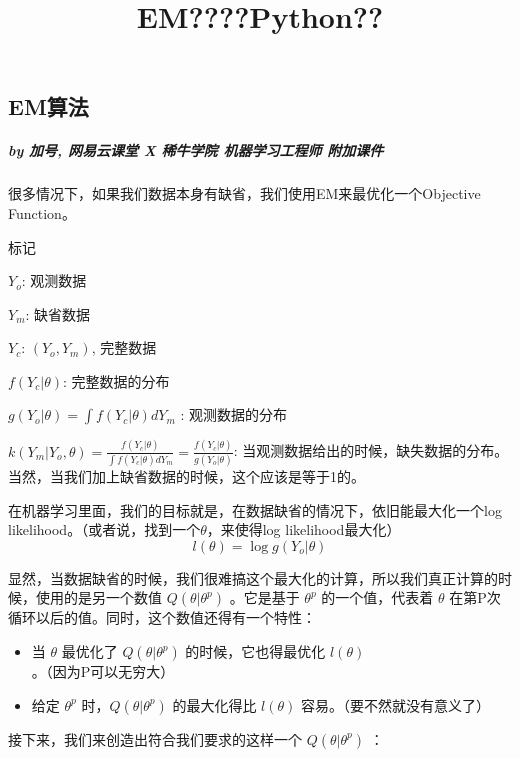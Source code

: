 \documentclass[11pt]{article}
\title{EM????Python??}
\providecommand{\tightlist}{%
      \setlength{\itemsep}{0pt}\setlength{\parskip}{0pt}}
\begin{document}
    
    
    \maketitle
    
    

    
    \subsection{EM算法}\label{emux7b97ux6cd5}

\subparagraph{by 加号, 网易云课堂 X 稀牛学院 机器学习工程师
附加课件}\label{by-ux52a0ux53f7-ux7f51ux6613ux4e91ux8bfeux5802-x-ux7a00ux725bux5b66ux9662-ux673aux5668ux5b66ux4e60ux5de5ux7a0bux5e08-ux9644ux52a0ux8bfeux4ef6}

很多情况下，如果我们数据本身有缺省，我们使用EM来最优化一个Objective
Function。

标记

\(Y_o\): 观测数据

\(Y_m\): 缺省数据

\(Y_c\): \((Y_o, Y_m)\), 完整数据

\(f(Y_c|\theta)\): 完整数据的分布

\(g(Y_o | \theta) = \int f(Y_c|\theta) dY_m\) : 观测数据的分布

\(k(Y_m | Y_o, \theta) = \frac{f(Y_c|\theta)}{\int f(Y_c|\theta) dY_m} =\frac{f(Y_c|\theta)}{g(Y_o |\theta)}\):
当观测数据给出的时候，缺失数据的分布。当然，当我们加上缺省数据的时候，这个应该是等于1的。

在机器学习里面，我们的目标就是，在数据缺省的情况下，依旧能最大化一个log
likelihood。（或者说，找到一个\(\theta\)，来使得log likelihood最大化）
\[l(\theta) = \log g(Y_o| \theta)\]

显然，当数据缺省的时候，我们很难搞这个最大化的计算，所以我们真正计算的时候，使用的是另一个数值
\(Q(\theta | \theta^{p})\) 。它是基于 \(\theta^{p}\) 的一个值，代表着
\(\theta\) 在第P次循环以后的值。同时，这个数值还得有一个特性：

\begin{itemize}
\tightlist
\item
  当 \(\theta\) 最优化了 \(Q(\theta | \theta^{p})\) 的时候，它也得最优化
  \(l(\theta)\) 。（因为P可以无穷大）
\item
  给定 \(\theta^{p}\) 时，\(Q(\theta | \theta^{p})\) 的最大化得比
  \(l(\theta)\) 容易。（要不然就没有意义了）
\end{itemize}

接下来，我们来创造出符合我们要求的这样一个 \(Q(\theta | \theta^{p})\) ：
\end{document}
